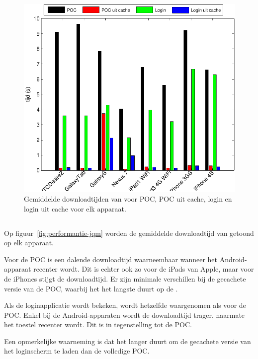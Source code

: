 \begin{figure}[H]
  \centering
  \includegraphics[width=\textwidth]{figuren/performance-kendo.pdf}
  \caption{Gemiddelde downloadtijden van \kendo{} voor POC,  POC uit cache,  login en login uit cache voor elk apparaat.}
  \label{fig:performantie-kendo}
\end{figure}

\subsection{\jqm}
Op figuur~\ref{fig:performantie-jqm} worden de gemiddelde downloadtijd van \jqm{} getoond op elk apparaat.

Voor de POC is een dalende downloadtijd waarneembaar wanneer het Android-apparaat recenter wordt.
Dit is echter ook zo voor de iPads van Apple, maar voor de iPhones stijgt de downloadtijd.
Er zijn minimale verschillen bij de gecachete versie van de POC, waarbij het het langste duurt op de \ipadi{}.

Als de loginapplicatie wordt bekeken, wordt hetzelfde waargenomen als voor de POC.
Enkel bij de Android-apparaten wordt de downloadtijd trager, naarmate het toestel recenter wordt.
Dit is in tegenstelling tot de POC.

Een opmerkelijke waarneming is dat het langer duurt om de gecachete versie van het loginscherm te laden dan de volledige POC.

